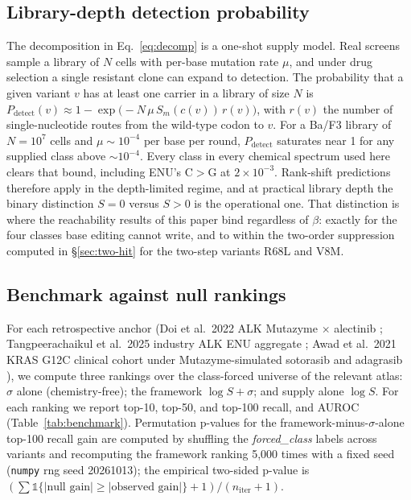 \documentclass[11pt,a4paper]{article}
\begin{document}
\subsection{Library-depth detection probability}
\label{sec:p-detect}
The decomposition in Eq.~\ref{eq:decomp} is a one-shot supply model.
Real screens sample a library of $N$ cells with per-base mutation rate
$\mu$, and under drug selection a single resistant clone can expand to
detection. The probability that a given variant $v$ has at least one
carrier in a library of size $N$ is
$P_{\mathrm{detect}}(v) \approx 1 - \exp\!\big(-N\,\mu\,S_m(c(v))\,r(v)\big)$,
with $r(v)$ the number of single-nucleotide routes from the wild-type
codon to $v$. For a Ba/F3 library of $N = 10^7$ cells and
$\mu \sim 10^{-4}$ per base per round, $P_{\mathrm{detect}}$ saturates
near 1 for any supplied class above $\sim 10^{-4}$. Every class in
every chemical spectrum used here clears that bound, including ENU's
C$>$G at $2\times 10^{-3}$. Rank-shift predictions therefore apply in
the depth-limited regime, and at practical library depth the binary
distinction $S = 0$ versus $S > 0$ is the operational one. That
distinction is where the reachability results of this paper bind
regardless of $\beta$: exactly for the four classes base editing
cannot write, and to within the two-order suppression computed in
\S\ref{sec:two-hit} for the two-step variants R68L and V8M.

\subsection{Benchmark against null rankings}
\label{sec:benchmark}
For each retrospective anchor (Doi et al.\ 2022 ALK Mutazyme $\times$
alectinib \citep{doi2022}; Tangpeerachaikul et al.\ 2025 industry
ALK ENU aggregate \citep{tangpeerachaikul2025}; Awad et al.\ 2021
KRAS G12C clinical cohort under Mutazyme-simulated sotorasib and
adagrasib \citep{awad2021}), we compute three rankings over the class-forced universe
of the relevant atlas: $\sigma$ alone (chemistry-free); the framework
$\log S + \sigma$; and supply alone $\log S$. For each ranking we report
top-10, top-50, and top-100 recall, and AUROC
(Table~\ref{tab:benchmark}). Permutation p-values for the
framework-minus-$\sigma$-alone top-100 recall gain are computed by
shuffling the \emph{forced\_class} labels across
variants and recomputing the framework ranking 5{,}000 times with a
fixed seed (\texttt{numpy} rng seed 20261013); the empirical two-sided
p-value is $(\sum \mathbb{1}\{\lvert\text{null gain}\rvert \geq
\lvert\text{observed gain}\rvert\} + 1) / (n_{\mathrm{iter}} + 1)$.
\end{document}
